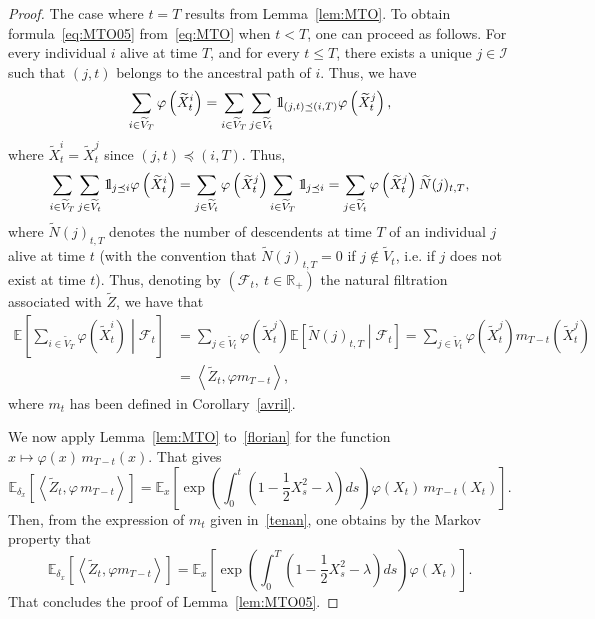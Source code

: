 \documentclass[10pt]{amsart}
\theoremstyle{definition}\newtheorem{defi}[theo]{Definition}\newtheorem{rema}[theo]{Remark}\newtheorem{exam}[theo]{Example}\newtheorem{exem}[theo]{Example}\newtheorem{nota}[theo]{Notation}
\newcommand{\Fo}{\mathcal{F}}
\newcommand{\Io}{\mathcal{I}}
\newcommand*\R{\mathbb{R}}
\newcommand*\E{\mathbb{E}}
\newcommand*\ind{{\mathchoice {\rm 1\mskip-4mu l} {\rm 1\mskip-4mu l} {\rm 1\mskip-4.5mu l} {\rm 1\mskip-5mu l}}}
\begin{document}
\begin{proof}
The case where $t=T$ results from Lemma~\ref{lem:MTO}.
To obtain formula~\eqref{eq:MTO05} from~\eqref{eq:MTO} when $t<T$, one can proceed as follows. For every individual $i$ alive at time $T$, and for every $t\leq T$, there exists a unique $j\in \Io$ such that $(j,t)$ belongs to the ancestral path of $i$. Thus, we have
\[
\sum_{i \in \widetilde{V}_{T}}\varphi\left(\widetilde{X}^{i}_{t}\right)=\sum_{i \in \widetilde{V}_{T}}\sum_{j \in \widetilde{V}_{t}} \ind_{(j, t) \preceq (i, T)} \varphi\left(\widetilde{X}^{j}_{t}\right),
\]
where $\widetilde{X}^{i}_{t}=\widetilde{X}^{j}_{t}$ since $(j,t)\preceq (i,T)$. Thus,
\[
\sum_{i \in \widetilde{V}_{T}}\sum_{j \in \widetilde{V}_{t}} \ind_{j \preceq i} \varphi\left(\widetilde{X}^{i}_{t}\right)=\sum_{j \in \widetilde{V}_{t}}\varphi\left(\widetilde{X}^{j}_{t}\right)\sum_{i \in \widetilde{V}_{T}} \ind_{j \preceq i} =\sum_{j \in \widetilde{V}_{t}}\varphi\left(\widetilde{X}^{j}_{t}\right)\widetilde{N}(j)_{t, T},
\]
where $\widetilde{N}(j)_{t, T}$ denotes the number of descendents at time $T$ of an individual $j$ alive at time $t$ (with the convention that $\widetilde{N}(j)_{t, T}=0$ if $j\notin \widetilde{V}_{t}$, i.e. if $j$ does not exist at time $t$). Thus, denoting by $\left(\Fo_{t},\ t\in\R_{+} \right)$ the natural filtration associated with $\widetilde Z$, we have that
\begin{equation}\label{florian}
\begin{split}
\E\left[\sum_{i \in \widetilde{V}_{T}}\varphi\left(\widetilde{X}^{i}_{t}\right)\middle| \Fo_{t}\right]&=\sum_{j \in \widetilde{V}_{t}}\varphi\left(\widetilde{X}^{j}_{t}\right)\E\left[\widetilde{N}(j)_{t, T}\middle| \Fo_{t}\right]=\sum_{j \in  \widetilde{V}_{t}}\varphi\left(\widetilde{X}^{j}_{t}\right)m_{T-t}\left(\widetilde{X}^{j}_{t}\right)\\
&=\left\langle \widetilde{Z}_{t},\varphi  m_{T-t}\right\rangle,
\end{split}
\end{equation}
where $m_{t}$ has been defined in Corollary~\ref{avril}.


We now apply Lemma~\ref{lem:MTO} to~\eqref{florian} for the function $x\mapsto \varphi(x)\,m_{T-t}(x)$. That gives
\[
\E_{\delta_{x}}\left[\left\langle \widetilde{Z}_{t},\varphi \,m_{T-t}\right\rangle\right]=\E_{x}\left[\exp\left(\int_{0}^{t} \left(1-\frac{1}{2}X_{s}^{2}-\lambda \right)ds \right)\varphi\left(X_{t}\right)\,m_{T-t}\left(X_{t}\right) \right].
\]
Then, from the expression of $m_{t}$ given in~\eqref{tenan}, one obtains by the Markov property that
\[
\E_{\delta_{x}}\left[\left\langle \widetilde{Z}_{t},\varphi  m_{T-t}\right\rangle\right]=\E_{x}\left[\exp\left(\int_{0}^{T} \left(1-\frac{1}{2}X_{s}^{2}-\lambda \right)ds \right)\varphi\left(X_{t}\right) \right].
\]
That concludes the proof of Lemma~\ref{lem:MTO05}.
\end{proof}
\end{document}
